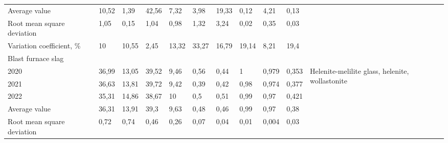 \begin{table}[H]
{\begin{tabular}{|llllllllllp{}|}
\multicolumn{1}{|l|}{Average value} & \multicolumn{1}{l|}{10,52} & \multicolumn{1}{l|}{1,39} & \multicolumn{1}{l|}{42,56} & \multicolumn{1}{l|}{7,32} & \multicolumn{1}{l|}{3,98} & \multicolumn{1}{l|}{19,33} & \multicolumn{1}{l|}{0,12} & \multicolumn{1}{l|}{4,21} & \multicolumn{1}{l|}{0,13} &  \\ \cline{1-10}
\multicolumn{1}{|l|}{Root mean square deviation} & \multicolumn{1}{l|}{1,05} & \multicolumn{1}{l|}{0,15} & \multicolumn{1}{l|}{1,04} & \multicolumn{1}{l|}{0,98} & \multicolumn{1}{l|}{1,32} & \multicolumn{1}{l|}{3,24} & \multicolumn{1}{l|}{0,02} & \multicolumn{1}{l|}{0,35} & \multicolumn{1}{l|}{0,03} &  \\ \cline{1-10}
\multicolumn{1}{|l|}{Variation coefficient, \%} & \multicolumn{1}{l|}{10} & \multicolumn{1}{l|}{10,55} & \multicolumn{1}{l|}{2,45} & \multicolumn{1}{l|}{13,32} & \multicolumn{1}{l|}{33,27} & \multicolumn{1}{l|}{16,79} & \multicolumn{1}{l|}{19,14} & \multicolumn{1}{l|}{8,21} & \multicolumn{1}{l|}{19,4} &  \\ \hline
\multicolumn{11}{|l|}{Blast furnace slag} \\ \hline
\multicolumn{1}{|l|}{2020} & \multicolumn{1}{l|}{36,99} & \multicolumn{1}{l|}{13,05} & \multicolumn{1}{l|}{39,52} & \multicolumn{1}{l|}{9,46} & \multicolumn{1}{l|}{0,56} & \multicolumn{1}{l|}{0,44} & \multicolumn{1}{l|}{1} & \multicolumn{1}{l|}{0,979} & \multicolumn{1}{l|}{0,353} & \multirow{6}{=}{Helenite-melilite glass, helenite, wollastonite} \\ \cline{1-10}
\multicolumn{1}{|l|}{2021} & \multicolumn{1}{l|}{36,63} & \multicolumn{1}{l|}{13,81} & \multicolumn{1}{l|}{39,72} & \multicolumn{1}{l|}{9,42} & \multicolumn{1}{l|}{0,39} & \multicolumn{1}{l|}{0,42} & \multicolumn{1}{l|}{0,98} & \multicolumn{1}{l|}{0,974} & \multicolumn{1}{l|}{0,377} &  \\ \cline{1-10}
\multicolumn{1}{|l|}{2022} & \multicolumn{1}{l|}{35,31} & \multicolumn{1}{l|}{14,86} & \multicolumn{1}{l|}{38,67} & \multicolumn{1}{l|}{10} & \multicolumn{1}{l|}{0,5} & \multicolumn{1}{l|}{0,51} & \multicolumn{1}{l|}{0,99} & \multicolumn{1}{l|}{0,97} & \multicolumn{1}{l|}{0,421} &  \\ \cline{1-10}
\multicolumn{1}{|l|}{Average value} & \multicolumn{1}{l|}{36,31} & \multicolumn{1}{l|}{13,91} & \multicolumn{1}{l|}{39,3} & \multicolumn{1}{l|}{9,63} & \multicolumn{1}{l|}{0,48} & \multicolumn{1}{l|}{0,46} & \multicolumn{1}{l|}{0,99} & \multicolumn{1}{l|}{0,97} & \multicolumn{1}{l|}{0,38} &  \\ \cline{1-10}
\multicolumn{1}{|l|}{Root mean square deviation} & \multicolumn{1}{l|}{0,72} & \multicolumn{1}{l|}{0,74} & \multicolumn{1}{l|}{0,46} & \multicolumn{1}{l|}{0,26} & \multicolumn{1}{l|}{0,07} & \multicolumn{1}{l|}{0,04} & \multicolumn{1}{l|}{0,01} & \multicolumn{1}{l|}{0,004} & \multicolumn{1}{l|}{0,03} &  \\ \cline{1-10}

\end{tabular}}
\end{table}
